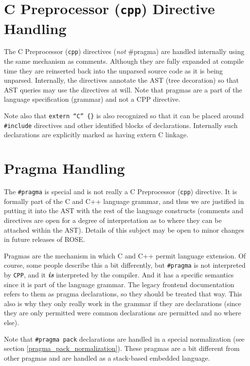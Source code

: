 \section {C Preprocessor ({\tt cpp}) Directive Handling}
    The C Preprocessor ({\tt cpp}) directives ({\em not} \#pragma) are handled internally using the same mechanism as
comments.  Although they are fully expanded at compile time they are reinserted back
into the unparsed source code as it is being unparsed.  Internally, the directives annotate the AST
(tree decoration) so that AST queries may use the directives at will.
Note that pragmas are a part of the language specification (grammar) and not a CPP directive.

  Note also that {\tt extern ``C'' \{\}} is also recognized so that it can be
placed around {\tt \#include} directives and other identified blocks of declarations.
Internally such declarations are explicitly marked as having extern C linkage.

\section {Pragma Handling}
   The {\tt \#pragma} is special and is not really a C Preprocessor ({\tt cpp}) directive.
It is formally part of the C and C++ language grammar, and thus we are justified in putting it 
into the AST with the rest of the language constructs (comments and directives are open for 
a degree of interpretation as to where they can be attached within the AST). Details of
this subject may be open to minor changes in future releases of ROSE.

  Pragmas are the mechanism in which C and C++ permit language
extension.  Of course, some people describe this a bit differently,
but {\tt \#pragma} is not interpreted by {\tt CPP}, and it {\it {\bf is}} interpreted by the compiler.
And it has a specific semantics since it is part of the language grammar.
The legacy frontend documentation refers to them as pragma declarations, so they should be 
treated that way. This also is why they only really work in the grammar if 
they are declarations (since they are only permitted were common declarations 
are permitted and no where else).

Note that {\tt \#pragma pack} declarations are handled in a special normalization
(see section \ref{pragma_pack_normalization}).  These pragmas are a bit different
from other pragmas and are handled as a stack-based embedded language.


